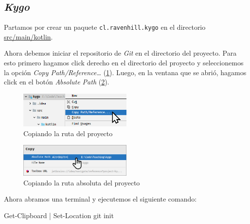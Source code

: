 
\subsection{\textit{Kygo}}
  Partamos por crear un paquete \texttt{cl.ravenhill.kygo} en el directorio \url{src/main/kotlin}.

  Ahora debemos iniciar el repositorio de \textit{Git} en el directorio del proyecto.
  Para esto primero hagamos click derecho en el directorio del proyecto y seleccionemos la opción
  \textit{Copy Path/Reference\dots} (\cref{fig:copy-path}).
  Luego, en la ventana que se abrió, hagamos click en el botón \textit{Absolute Path} 
  (\cref{fig:abs-path}).

  \begin{figure}[H]
    \centering
    \includegraphics[width=0.5\textwidth]{img/oop/principios/vcs/copy-path.png}
    \caption{Copiando la ruta del proyecto}
    \label{fig:copy-path}
  \end{figure}

  \begin{figure}[H]
    \centering
    \includegraphics[width=0.5\textwidth]{img/oop/principios/vcs/abs-path.png}
    \caption{Copiando la ruta absoluta del proyecto}
    \label{fig:abs-path}
  \end{figure}

  Ahora abramos una terminal y ejecutemos el siguiente comando:

  \begin{defaultbox}[Windows]
    \begin{powershell}
      Get-Clipboard | Set-Location
      git init
    \end{powershell}
  \end{defaultbox}

  \begin{defaultbox}[Linux]
  \end{defaultbox}

